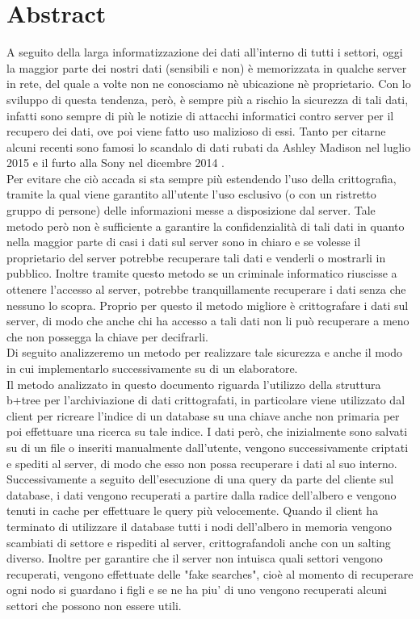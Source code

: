 \chapter*{Abstract}


A seguito della larga informatizzazione dei dati all'interno di tutti i settori, oggi la maggior parte dei nostri dati (sensibili e non) \`e memorizzata in qualche server in rete, del quale a volte non ne conosciamo n\`e ubicazione n\`e proprietario. 
Con lo sviluppo di questa tendenza, per\`o, \`e sempre pi\`u a rischio la sicurezza di tali dati, infatti sono sempre di pi\`u le notizie di attacchi informatici contro server per il recupero dei dati, ove poi viene fatto uso malizioso di essi. Tanto per citarne alcuni recenti sono famosi lo scandalo di dati rubati da Ashley Madison nel luglio 2015 \cite{madison} e il furto alla Sony nel dicembre 2014 \cite{sony}.\\
Per evitare che ci\`o accada si sta sempre pi\`u estendendo l'uso della crittografia, tramite la qual viene garantito all'utente l'uso esclusivo (o con un ristretto gruppo di persone) delle informazioni messe a disposizione dal server. 
Tale metodo per\`o non \`e sufficiente a garantire la confidenzialità di tali dati in quanto nella maggior parte di casi i dati sul server sono in chiaro e se volesse il proprietario del server potrebbe recuperare tali dati e venderli o mostrarli in pubblico. Inoltre tramite questo metodo se un criminale informatico riuscisse a ottenere l'accesso al server, potrebbe tranquillamente recuperare i dati senza che nessuno lo scopra. 
Proprio per questo il metodo migliore \`e crittografare i dati sul server, di modo che anche chi ha accesso a tali dati non li pu\`o recuperare a meno che non possegga la chiave per decifrarli.\\
Di seguito analizzeremo un metodo per realizzare tale sicurezza e anche il modo in cui implementarlo successivamente su di un elaboratore.\\
Il metodo analizzato in questo documento riguarda l'utilizzo della struttura b+tree per l'archiviazione di dati crittografati, in particolare viene utilizzato dal client per ricreare l'indice di un database su una chiave anche non primaria per poi effettuare una ricerca su tale indice.
I dati per\`o, che inizialmente sono salvati su di un file o inseriti manualmente dall'utente, vengono successivamente criptati e spediti al server, di modo che esso non possa recuperare i dati al suo interno. Successivamente a seguito dell'esecuzione di una query da parte del cliente sul database, i dati vengono recuperati a partire dalla radice dell'albero e vengono tenuti in cache per effettuare le query pi\`u velocemente. Quando il client ha terminato di utilizzare il database tutti i nodi dell'albero in memoria vengono scambiati di settore e rispediti al server, crittografandoli anche con un salting diverso. Inoltre per garantire che il server non intuisca quali settori vengono recuperati, vengono effettuate delle "fake searches", cio\`e al momento di recuperare ogni nodo si guardano i figli e se ne ha piu' di uno vengono recuperati alcuni settori che possono non essere utili.
